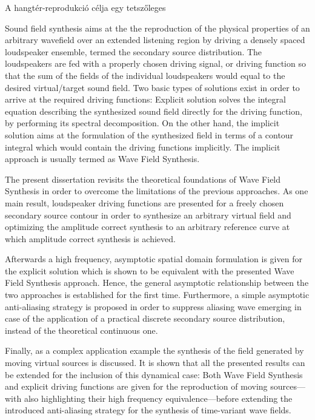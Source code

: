 A hangtér-reprodukció célja egy tetszőleges 

Sound field synthesis aims at the the reproduction of the physical properties of an arbitrary wavefield over an extended listening region by driving a densely spaced loudspeaker ensemble, termed the secondary source distribution.
The loudspeakers are fed with a properly chosen driving signal, or driving function so that the sum of the fields of the individual loudspeakers would equal to the desired virtual/target sound field.
Two basic types of solutions exist in order to arrive at the required driving functions:
Explicit solution solves the integral equation describing the synthesized sound field directly for the driving function, by performing its spectral decomposition.
On the other hand, the implicit solution aims at the formulation of the synthesized field in terms of a contour integral which would contain the driving functions implicitly.
The implicit approach is usually termed as Wave Field Synthesis.

The present dissertation revisits the theoretical foundations of Wave Field Synthesis in order to overcome the limitations of the previous approaches.
As one main result, loudspeaker driving functions are presented for a freely chosen secondary source contour in order to synthesize an arbitrary virtual field and optimizing the amplitude correct synthesis to an arbitrary reference curve at which amplitude correct synthesis is achieved.

Afterwards a high frequency, asymptotic spatial domain formulation is given for the explicit solution which is shown to be equivalent with the presented Wave Field Synthesis approach.
Hence, the general asymptotic relationship between the two approaches is established for the first time.
Furthermore, a simple asymptotic anti-aliasing strategy is proposed in order to suppress aliasing wave emerging in case of the application of a practical discrete secondary source distribution, instead of the theoretical continuous one.

Finally, as a complex application example the synthesis of the field generated by moving virtual sources is discussed.
It is shown that all the presented results can be extended for the inclusion of this dynamical case: 
Both Wave Field Synthesis and explicit driving functions are given for the reproduction of moving sources---with also highlighting their high frequency equivalence---before extending the introduced anti-aliasing strategy for the synthesis of time-variant wave fields.